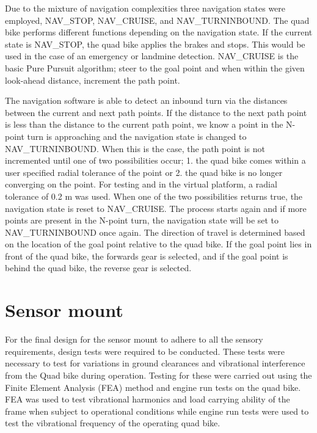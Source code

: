 \documentclass[main.tex]{subfiles}
\begin{document}
Due to the mixture of navigation complexities three navigation states were employed, NAV\_STOP, NAV\_CRUISE, and NAV\_TURNINBOUND. The quad bike performs different functions depending on the navigation state. If the current state is NAV\_STOP, the quad bike applies the brakes and stops. This would be used in the case of an emergency or landmine detection. NAV\_CRUISE is the basic Pure Pursuit algorithm; steer to the goal point and when within the given look-ahead distance, increment the path point.

The navigation software is able to detect an inbound turn via the distances between the current and next path points. If the distance to the next path point is less than the distance to the current path point, we know a point in the N-point turn is approaching and the navigation state is changed to NAV\_TURNINBOUND. When this is the case, the path point is not incremented until one of two possibilities occur; 1. the quad bike comes within a user specified radial tolerance of the point or 2. the quad bike is no longer converging on the point. For testing and in the virtual platform, a radial tolerance of 0.2 m was used. When one of the two possibilities returns true, the navigation state is reset to NAV\_CRUISE. The process starts again and if more points are present in the N-point turn, the navigation state will be set to NAV\_TURNINBOUND once again. The direction of travel is determined based on the location of the goal point relative to the quad bike. If the goal point lies in front of the quad bike, the forwards gear is selected, and if the goal point is behind the quad bike, the reverse gear is selected.

\section{Sensor mount}
For the final design for the sensor mount to adhere to all the sensory requirements, design tests were required to be conducted. These tests were necessary to test for variations in ground clearances and vibrational interference from the Quad bike during operation. Testing for these were carried out using the Finite Element Analysis (FEA) method and engine run tests on the quad bike. FEA was used to test vibrational harmonics and load carrying ability of the frame when subject to operational conditions while engine run tests were used to test the vibrational frequency of the operating quad bike. 
\end{document}
